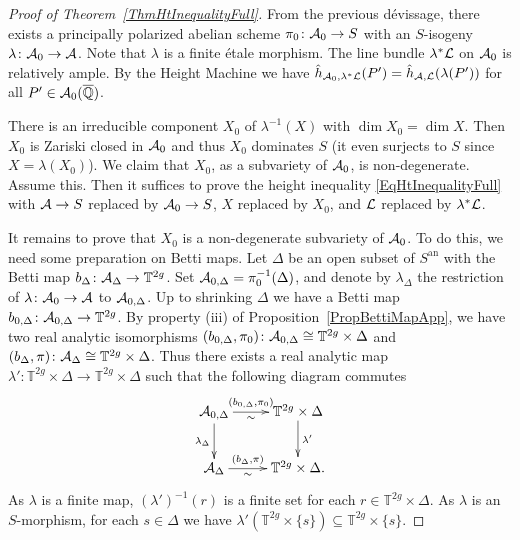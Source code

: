 \begin{proof}[Proof of Theorem~\ref{ThmHtInequalityFull}]
From the previous d\'{e}vissage, there exists a principally polarized abelian scheme $\pi_0 \colon \mathcal{A}_0 \rightarrow S$ with an $S$-isogeny $\lambda \colon \mathcal{A}_0 \rightarrow \mathcal{A}$. Note that $\lambda$ is a finite \'{e}tale morphism. The line bundle $\lambda^*{\mathcal L}$ on $\mathcal{A}_0$ is relatively ample. By the Height Machine we have $\hat{h}_{\mathcal{A}_0,\lambda^*{\mathcal L}}(P') = \hat{h}_{\mathcal{A},{\mathcal L}}(\lambda(P'))$ for all $P' \in \mathcal{A}_0({\overline{\mathbb{Q}}})$.

There is  an irreducible component $X_0$ of $\lambda^{-1}(X)$ with
$\dim X_0 = \dim X$. Then $X_0$ is Zariski closed in $\mathcal{A}_0$ and thus $X_0$ dominates $S$ (it even surjects to $S$
since $X = \lambda(X_0)$). We
claim that $X_0$, as a subvariety of $\mathcal{A}_0$, is non-degenerate. Assume this. Then it suffices to prove the height inequality \eqref{EqHtInequalityFull} with $\mathcal{A} \rightarrow S$ replaced by $\mathcal{A}_0 \rightarrow S$, $X$ replaced by $X_0$, and ${\mathcal L}$ replaced by $\lambda^*{\mathcal L}$. 

It remains to prove that $X_0$ is a non-degenerate subvariety of $\mathcal{A}_0$. To do this, we need some preparation on Betti maps. Let $\Delta$ be an open subset of $S^{\mathrm{an}}$ with the Betti map $b_{\Delta} \colon \mathcal{A}_{\Delta} \rightarrow \mathbb{T}^{2g}$. Set $\mathcal{A}_{0,\Delta} = \pi_0^{-1}(\Delta)$, and denote by $\lambda_{\Delta}$ the restriction of $\lambda \colon \mathcal{A}_0 \rightarrow \mathcal{A}$ to $\mathcal{A}_{0,\Delta}$. Up to shrinking $\Delta$ we have a Betti map $b_{0,\Delta} \colon \mathcal{A}_{0,\Delta} \rightarrow \mathbb{T}^{2g}$. By property (iii) of Proposition~\ref{PropBettiMapApp}, we have two real analytic isomorphisms $(b_{0,\Delta},\pi_0) \colon \mathcal{A}_{0,\Delta} \cong \mathbb{T}^{2g} \times \Delta$ and $(b_{\Delta},\pi) \colon \mathcal{A}_{\Delta} \cong \mathbb{T}^{2g} \times \Delta$. Thus there exists a real analytic map $\lambda' \colon \mathbb{T}^{2g} \times \Delta \rightarrow \mathbb{T}^{2g} \times \Delta$ such that the following diagram commutes
\[
\xymatrix{
\cA_{0,\Delta} \ar[r]^-{(b_{0,\Delta},\pi_0)}_-{\sim} \ar[d]_-{\lambda_{\Delta}} & \mathbb{T}^{2g} \times \Delta \ar[d]^-{\lambda'} \\
\cA_{\Delta} \ar[r]^-{(b_{\Delta},\pi)}_-{\sim} & \mathbb{T}^{2g} \times \Delta.
}
\]
As $\lambda$ is a finite map, $(\lambda')^{-1}(r)$ is a finite set for each $r \in \mathbb{T}^{2g} \times\Delta$. As $\lambda$ is an $S$-morphism, for each $s \in \Delta$ we have $\lambda'({\mathbb{T}^{2g} \times \{s\}}) \subseteq \mathbb{T}^{2g} \times \{s\}$.


\end{proof}
